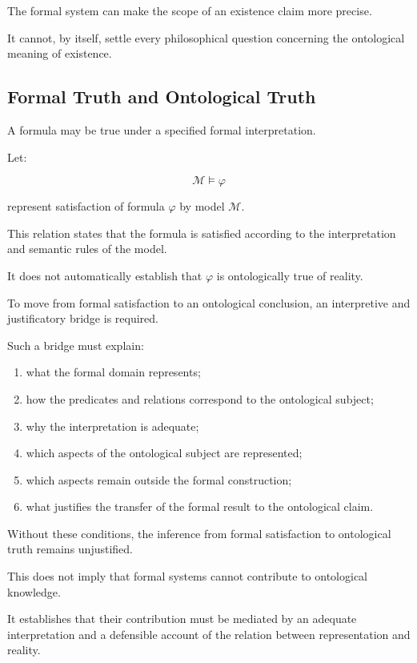The formal system
can make the scope
of an existence claim
more precise.

It cannot, by itself,
settle every philosophical
question concerning
the ontological meaning
of existence.

\subsection{Formal Truth and Ontological Truth}

A formula may be true
under a specified
formal interpretation.

Let:

\[
    \mathcal{M}\models\varphi
\]

represent satisfaction
of formula \(\varphi\)
by model \(\mathcal{M}\).

This relation states
that the formula
is satisfied according
to the interpretation
and semantic rules
of the model.

It does not automatically
establish that \(\varphi\)
is ontologically true
of reality.

To move from formal
satisfaction to an
ontological conclusion,
an interpretive and
justificatory bridge
is required.

Such a bridge must
explain:

\begin{enumerate}
    \item what the formal
    domain represents;
    \item how the predicates
    and relations correspond
    to the ontological
    subject;
    \item why the interpretation
    is adequate;
    \item which aspects
    of the ontological
    subject are represented;
    \item which aspects
    remain outside
    the formal construction;
    \item what justifies
    the transfer of
    the formal result
    to the ontological
    claim.
\end{enumerate}

Without these conditions,
the inference from
formal satisfaction
to ontological truth
remains unjustified.

This does not imply
that formal systems
cannot contribute
to ontological knowledge.

It establishes that
their contribution
must be mediated
by an adequate
interpretation and
a defensible account
of the relation
between representation
and reality.

